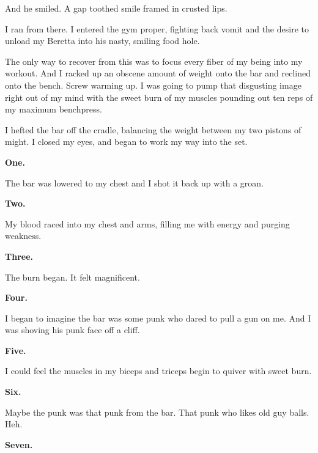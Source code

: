 And he smiled. A gap toothed smile framed in crusted lips.



I ran from there. I entered the gym proper, fighting back vomit and
the desire to unload my Beretta into his nasty, smiling food
hole.



The only way to recover from this was to focus every fiber of my
being into my workout. And I racked up an obscene amount of weight
onto the bar and reclined onto the bench. Screw warming up. I was
going to pump that disgusting image right out of my mind with the
sweet burn of my muscles pounding out ten reps of my maximum
benchpress.



I hefted the bar off the cradle, balancing the weight between my
two pistons of might. I closed my eyes, and began to work my way
into the set.



{\bf One.}



The bar was lowered to my chest and I shot it back up with a
groan.



{\bf Two.}



My blood raced into my chest and arms, filling me with energy and
purging weakness.



{\bf Three.}



The burn began. It felt magnificent.



{\bf Four.}



I began to imagine the bar was some punk who dared to pull a gun on
me. And I was shoving his punk face off a cliff.



{\bf Five.}



I could feel the muscles in my biceps and triceps begin to quiver
with sweet burn.



{\bf Six.}



Maybe the punk was that punk from the bar. That punk who likes old
guy balls. Heh.



{\bf Seven.}




